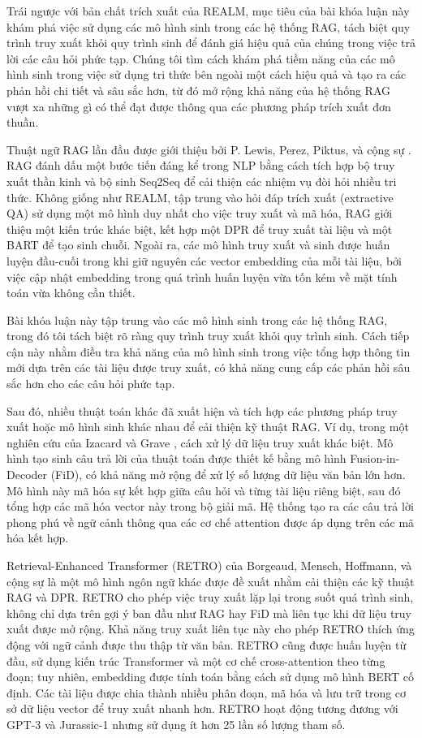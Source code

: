 Trái ngược với bản chất trích xuất của REALM, mục tiêu của bài khóa luận này khám phá việc sử dụng các mô hình sinh trong các hệ thống RAG, tách biệt quy trình truy xuất khỏi quy trình sinh để đánh giá hiệu quả của chúng trong việc trả lời các câu hỏi phức tạp. Chúng tôi tìm cách khám phá tiềm năng của các mô hình sinh trong việc sử dụng tri thức bên ngoài một cách hiệu quả và tạo ra các phản hồi chi tiết và sâu sắc hơn, từ đó mở rộng khả năng của hệ thống RAG vượt xa những gì có thể đạt được thông qua các phương pháp trích xuất đơn thuần.

Thuật ngữ RAG lần đầu được giới thiệu bởi P. Lewis, Perez, Piktus, và cộng sự \cite{lewis2020retrieval}. RAG đánh dấu một bước tiến đáng kể trong NLP bằng cách tích hợp bộ truy xuất thần kinh và bộ sinh Seq2Seq để cải thiện các nhiệm vụ đòi hỏi nhiều tri thức. Không giống như REALM, tập trung vào hỏi đáp trích xuất (extractive QA) sử dụng một mô hình duy nhất cho việc truy xuất và mã hóa, RAG giới thiệu một kiến trúc khác biệt, kết hợp một DPR để truy xuất tài liệu và một BART để tạo sinh chuỗi. Ngoài ra, các mô hình truy xuất và sinh được huấn luyện đầu-cuối trong khi giữ nguyên các vector embedding của mỗi tài liệu, bởi việc cập nhật embedding trong quá trình huấn luyện vừa tốn kém về mặt tính toán vừa không cần thiết.

Bài khóa luận này tập trung vào các mô hình sinh trong các hệ thống RAG, trong đó tôi tách biệt rõ ràng quy trình truy xuất khỏi quy trình sinh. Cách tiếp cận này nhằm điều tra khả năng của mô hình sinh trong việc tổng hợp thông tin mới dựa trên các tài liệu được truy xuất, có khả năng cung cấp các phản hồi sâu sắc hơn cho các câu hỏi phức tạp.

Sau đó, nhiều thuật toán khác đã xuất hiện và tích hợp các phương pháp truy xuất hoặc mô hình sinh khác nhau để cải thiện kỹ thuật RAG. Ví dụ, trong một nghiên cứu của Izacard và Grave \cite{izacard2020leveraging}, cách xử lý dữ liệu truy xuất khác biệt. Mô hình tạo sinh câu trả lời của thuật toán được thiết kế bằng mô hình Fusion-in-Decoder (FiD), có khả năng mở rộng để xử lý số lượng dữ liệu văn bản lớn hơn. Mô hình này mã hóa sự kết hợp giữa câu hỏi và từng tài liệu riêng biệt, sau đó tổng hợp các mã hóa vector này trong bộ giải mã. Hệ thống tạo ra các câu trả lời phong phú về ngữ cảnh thông qua các cơ chế attention được áp dụng trên các mã hóa kết hợp.

Retrieval-Enhanced Transformer (RETRO) của Borgeaud, Mensch, Hoffmann, và cộng sự \cite{borgeaud2022improving} là một mô hình ngôn ngữ khác được đề xuất nhằm cải thiện các kỹ thuật RAG và DPR. RETRO cho phép việc truy xuất lặp lại trong suốt quá trình sinh, không chỉ dựa trên gợi ý ban đầu như RAG hay FiD mà liên tục khi dữ liệu truy xuất được mở rộng. Khả năng truy xuất liên tục này cho phép RETRO thích ứng động với ngữ cảnh được thu thập từ văn bản. RETRO cũng được huấn luyện từ đầu, sử dụng kiến trúc Transformer và một cơ chế cross-attention theo từng đoạn; tuy nhiên, embedding được tính toán bằng cách sử dụng mô hình BERT cố định. Các tài liệu được chia thành nhiều phân đoạn, mã hóa và lưu trữ trong cơ sở dữ liệu vector để truy xuất nhanh hơn. RETRO hoạt động tương đương với GPT-3 và Jurassic-1 nhưng sử dụng ít hơn 25 lần số lượng tham số.

